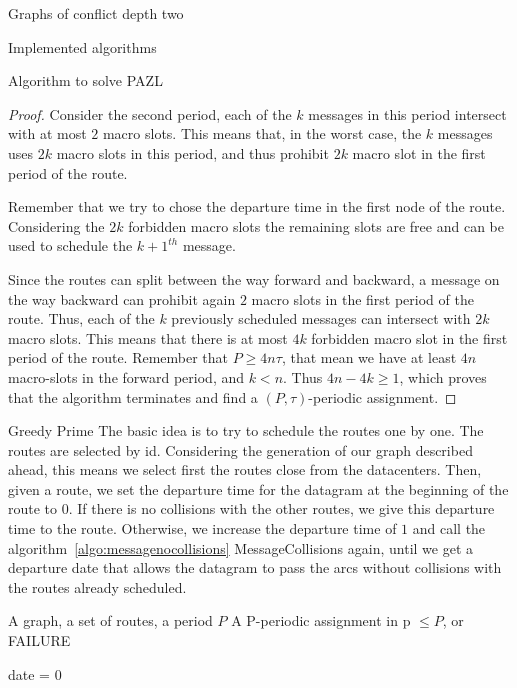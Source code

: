 \documentclass[10pt]{article}
\begin{document}
\begin{section}{Graphs of conflict depth two}
\begin{subsection}{Implemented algorithms}
\begin{subsubsection}{Algorithm to solve PAZL }
\begin{proof}
     Consider the second period, each of the $k$ messages in this period intersect with at most $2$ macro slots. This means that, in the worst case, the $k$ messages uses $2k$ macro slots in this period, and thus prohibit $2k$ macro slot in the first period of the route.
     
     Remember that we try to chose the departure time in the first node of the route. Considering the $2k$ forbidden macro slots the remaining slots are free and can be used to schedule the $k+1^{th}$ message. 
     
     Since the routes can split between the way forward and backward, a message on the way backward can prohibit again $2$ macro slots in the first period of the route. Thus, each of the $k$ previously scheduled messages can intersect with $2k$ macro slots.
     This means that there is at most $4k$ forbidden macro slot in the first period of the route. Remember that $P \geq 4n\tau$, that mean we have at least $4n$ macro-slots in the forward period, and $k < n$. Thus $4n - 4k \geq 1$, which proves that the algorithm terminates and find a  $(P,\tau)$-periodic assignment. 
   
   
     \end{proof}
   
  \begin{paragraph}{Greedy Prime}
  The basic idea is to try to schedule the routes one by one. The routes are selected by id. Considering the generation of our graph described ahead, this means we select first the routes close from the datacenters.  Then, given a route, we set the departure time for the datagram at the beginning of the route to $0$. If there is no collisions with the other routes, we give this departure time to the route. Otherwise, we increase the departure time of $1$ and call the algorithm~\ref{algo:messagenocollisions} MessageCollisions again, until we get a departure date that allows the datagram to pass the arcs without collisions with the routes already scheduled.

   	\begin{algorithm}[H]
 	\caption{Greedy Prime}
	\label{algo:greedyprime}
 	\begin{algorithmic}
 	\REQUIRE A graph, a set of routes, a period $P$
	\ENSURE A P-periodic assignment in p $\leq P$, or FAILURE

	\STATE date = $0$
	
 	

\end{algorithmic}
\end{algorithm}
\end{paragraph}
\end{subsubsection}
\end{subsection}
\end{section}
\end{document}
